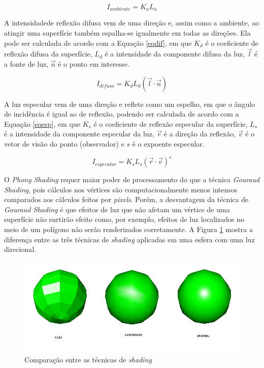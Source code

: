 {	\begin{equation}
		I_ {ambiente} = K_ {a}L_ {a} 
	\label{eqamb}
	\end{equation}

	A intensidadede reflexão difusa vem de uma direção e, assim como a ambiente, ao atingir uma superfície também espalha-se igualmente em todas as direções. Ela pode ser calculada de acordo com a Equação \ref{eqdif}, em que $K_ {d}$ é o coeficiente de reflexão difusa da superfície, $L_ {d}$ é a intensidade da componente difusa da luz, $\overrightarrow{ l}$ é a fonte de luz, $\overrightarrow{ n}$ é o ponto em interesse.

	\begin{equation}
		I_ {difusa} = K_ {d}L_ {d}( \overrightarrow{ l} \cdot \overrightarrow{ n}) 
	\label{eqdif}
	\end{equation}

	 A luz especular vem de uma direção e reflete como um espelho, em que o ângulo de incidência é igual ao de reflexão, podendo ser calculada de acordo com a Equação \ref{eqesp}, em que $K_ {s}$ é o coeficiente de reflexão especular da superfície, $L_ {s}$ é a intensidade da componente especular da luz, $\overrightarrow{ r}$ é a direção da reflexão, $\overrightarrow{v}$ é o vetor de visão do ponto (observador) e $s$ é o expoente especular.

	\begin{equation}
		I_ {especular} =K_ {s}L_ {s} (\overrightarrow{ r} \cdot \overrightarrow{ v})^s
	\label{eqesp}
	\end{equation}

	 O \textit{Phong Shading} requer maior poder de processamento do que a técnica \textit{Gouraud Shading}, pois cálculos nos vértices são computacionalmente menos intensos comparados aos cálculos feitos por \textit{pixels}. Porém, a desvantagem da técnica de \textit{Gouraud Shading} é que efeitos de luz que não afetam um vértice de uma superfície não surtirão efeito como, por exemplo, efeitos de luz localizados no meio de um polígono não serão renderizados corretamente. A Figura \ref{fgp} mostra a diferença entre as três técnicas de \textit{shading} aplicadas em uma esfera com uma luz direcional. 

	\begin{figure}[ht]
	\centering
		\includegraphics[keepaspectratio=true,scale=0.5]{figuras/flatgp.jpg}
	\caption{Comparação entre as técnicas de \textit{shading}}
	\label{fgp}
	\end{figure}

}
